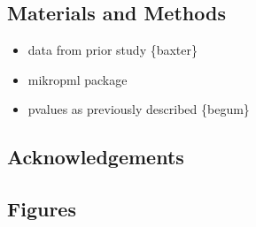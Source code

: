 \documentclass[
]{article}
\providecommand{\tightlist}{%
  \setlength{\itemsep}{0pt}\setlength{\parskip}{0pt}}
\begin{document}
\newpage

\hypertarget{materials-and-methods}{%
\subsection{Materials and Methods}\label{materials-and-methods}}

\begin{itemize}
\tightlist
\item
  data from prior study \{baxter\}
\item
  mikropml package
\item
  pvalues as previously described \{begum\}
\end{itemize}

\newpage

\hypertarget{acknowledgements}{%
\subsection{Acknowledgements}\label{acknowledgements}}

\newpage

\hypertarget{figures}{%
\subsection{Figures}\label{figures}}
\end{document}
